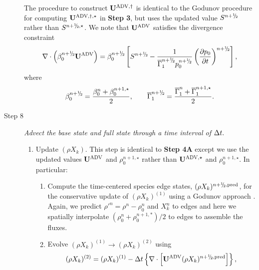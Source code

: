 \begin{description}
The procedure to construct ${\bf{U}}^{\mathrm{ADV},\dagger}$ is identical to the Godunov procedure
for computing ${\bf{U}}^{\mathrm{ADV},\dagger,\star}$ in {\bf Step 3}, but uses
the updated value $S^{\nph}$ rather than $S^{\nph,\star}$.
We note that ${\bf{U}}^{\mathrm{ADV}}$ satisfies the divergence constraint
\begin{equation}
\nabla \cdot \left(\beta_0^{\nph} \uadvtwo\right) =
\beta_0^{\nph} \left[S^{\nph} - \frac{1}{\gammaonebar^{\nph}p_0^{\nph}}\left(\frac{\partial p_0}{\partial t}\right)^{\nph}\right],\label{eq:div2}
\end{equation}
where
\begin{equation}
\beta_0^{\nph} = \frac{ \beta_0^n +  \beta_0^{n+1,\star} }{2},
\qquad
\gammaonebar^{\nph} = \frac{ \gammaonebar^n +  \gammaonebar^{n+1,\star} }{2}.
\end{equation}

\item[Step 8] {\em Advect the base state and full state through a time interval of $\Delta t.$}

\begin{enumerate}
\renewcommand{\theenumi}{{\bf \Alph{enumi}}}

\item Update $(\rho X_k)$.  This step is identical to {\bf Step 4A} except we use
  the updated values ${\bf{U}}^{\mathrm{ADV}}$ and $\rho_0^{n+1,\star}$ rather than
  ${\bf{U}}^{\mathrm{ADV},\star}$ and $\rho_0^{n+1,\star}$.  In particular:

\begin{enumerate}
\renewcommand{\labelenumii}{{\bf \roman{enumii}}.}

\item Compute the time-centered species edge states, $(\rho X_k)^{\nph,\pred}$,
  for the conservative update of $(\rho X_k)^{(1)}$ using a Godunov approach \citep{XRB_III}.
  Again, we predict $\rho'^n=\rho^n-\rho_0^n$ and $X_k^n$ to edges
  and here we spatially interpolate $(\rho_0^n+\rho_0^{n+1,*})/2$ to edges to assemble the fluxes.


\item Evolve $(\rho X_k)^{(1)} \rightarrow (\rho X_k)^{(2)}$ using
\begin{equation}
(\rho X_k)^{(2)} = (\rho X_k)^{(1)}
- \dt \left\{ \nabla \cdot \left[\uadvtwo (\rho X_k)^{\nph,\pred} \right] \right\},
\end{equation}

\end{enumerate}


\end{enumerate}
\end{description}
